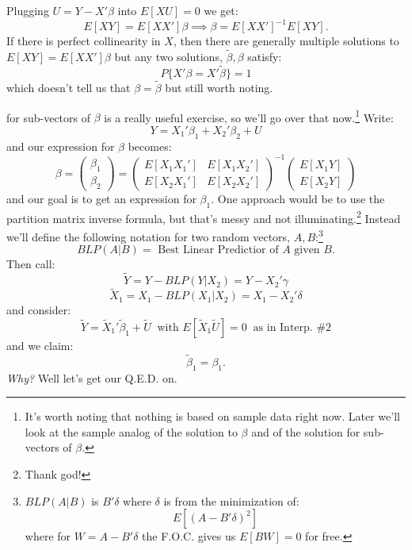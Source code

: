 \documentclass{tufte-book}
\theoremstyle{mytheoremstyle}
\theoremstyle{mylemstyle}
\theoremstyle{mydefstyle}
\begin{document}
\noindent Plugging \(U = Y - X'\beta\) into \(E[XU] = 0\) we get:
	\[E[XY] = E[XX']\beta \implies \beta = E[XX']^{-1}E[XY] \text{.}\]
If there is perfect collinearity in \(X\), then there are generally multiple solutions to \(E[XY] = E[XX']\beta\) but any two solutions, \(\tilde{\beta}, \beta\) satisfy:
	\[P\{X'\beta = X'\tilde{\beta}\} = 1\]
which doesn't tell us that \(\beta = \tilde{\beta}\) but still worth noting.

 for sub-vectors of \(\beta\) is a really useful exercise, so we'll go over that now.\footnote{It's worth noting that nothing is based on sample data right now. Later we'll look at the sample analog of the solution to \(\beta\) and of the solution for sub-vectors of \(\beta\).} Write:
	\[Y = X_1'\beta_1 + X_2'\beta_2 + U\]
and our expression for \(\beta\) becomes:
	\[\beta = \left(\begin{array}{c} \beta_1 \\ \beta_2\end{array}\right) = \left(\begin{array}{cc} E[X_1X_1'] & E[X_1X_2'] \\ E[X_2X_1'] & E[X_2X_2']\end{array}\right)^{-1} \left(\begin{array}{c}E[X_1Y] \\ E[X_2Y]\end{array}\right)\]
and our goal is to get an expression for \(\beta_1\). One approach would be to use the partition matrix inverse formula, but that's messy and not illuminating.\footnote{Thank god!} Instead we'll define the following notation for two random vectors, \(A, B\):\footnote{\(BLP(A|B)\) is \(B'\delta\) where \(\delta\) is from the minimization of:
	\[E[(A - B'\delta)^2]\]
	where for \(W = A - B'\delta\) the F.O.C. gives us \(E[BW] = 0\) for free.}
	\[BLP(A| B) = \text{ Best Linear Predictior of \(A\) given \(B\).}\]
Then call:
	\[\tilde{Y} = Y - BLP(Y|X_2) = Y - X_2' \gamma\]
	\[\tilde{X}_1 = X_1 - BLP(X_1 | X_2) = X_1 - X_2'\delta\]
and consider:
	\[\tilde{Y} = \tilde{X}_1'\tilde{\beta}_1 + \tilde{U}\ \text{ with } E[\tilde{X}_1 \tilde{U}] = 0\ \text{ as in Interp. \#2}\]
and we claim:
	\[\tilde{\beta}_1 = \beta_1 \text{.}\]
\emph{Why?} Well let's get our Q.E.D. on.
\end{document}
